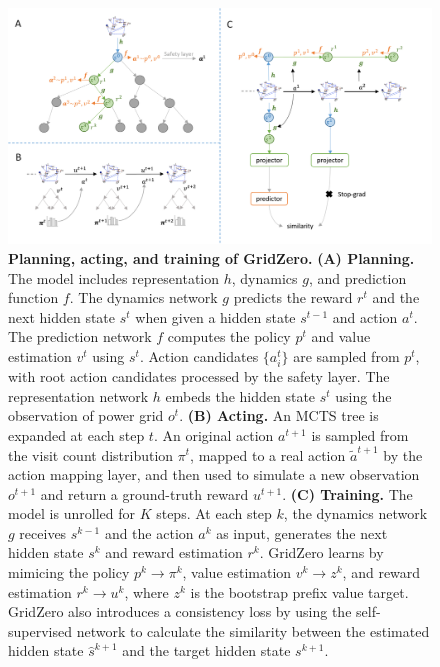 \begin{figure}[h]
  \centering
  \includegraphics[width=1.0\linewidth]{fig/birdsight_gridzero_v2.png}
  \caption{\textbf{Planning, acting, and training of GridZero.} \textbf{(A) Planning.} The model includes representation $h$, dynamics $g$, and prediction function $f$. The dynamics network $g$ predicts the reward $r^t$ and the next hidden state $s^t$ when given a hidden state $s^{t-1}$ and action $a^t$. The prediction network $f$ computes the policy $p^t$ and value estimation $v^t$ using $s^t$. Action candidates $\{a^t_i\}$ are sampled from $p^t$, with root action candidates processed by the safety layer. The representation network $h$ embeds the hidden state $s^t$ using the observation of power grid $o^t$. \textbf{(B) Acting.} An MCTS tree is expanded at each step $t$. An original action $a^{t+1}$ is sampled from the visit count distribution $\pi^t$, mapped to a real action $\tilde{a}^{t+1}$ by the action mapping layer, and then used to simulate a new observation $o^{t+1}$ and return a ground-truth reward $u^{t+1}$. \textbf{(C) Training.} The model is unrolled for $K$ steps.
  At each step $k$, the dynamics network $g$ receives $s^{k-1}$ and the action $a^{k}$ as input, generates the next hidden state $s^{k}$ and reward estimation $r^{k}$. GridZero learns by mimicing the policy $p^{k}\to\pi^{k}$, value estimation $v^{k}\to z^{k}$, and reward estimation $r^{k}\to u^{k}$, where $z^{k}$ is the bootstrap prefix value target. GridZero also introduces a consistency loss by using the self-supervised network to calculate the similarity between the estimated hidden state $\hat{s}^{k+1}$ and the target hidden state $s^{k+1}$.}
  \label{fig:how_gridzero_work}
\end{figure}

